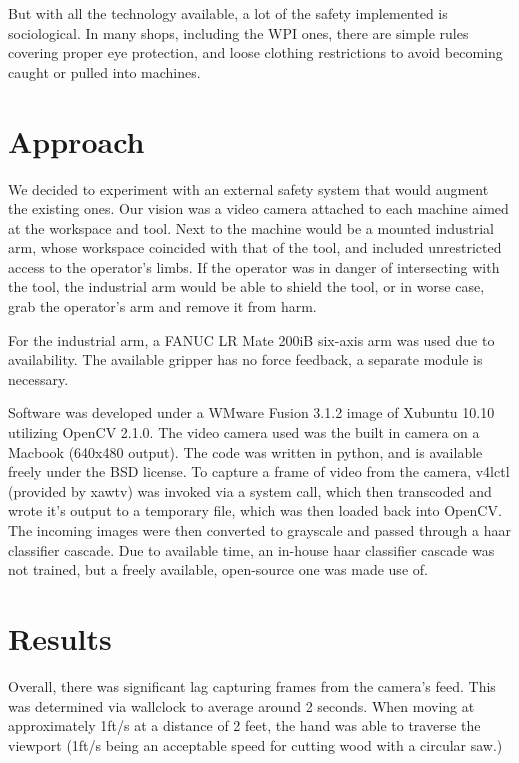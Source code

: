 \documentclass[12pt]{article}
\begin{document}
But with all the technology available, a lot of the safety implemented is sociological. In many shops, including the WPI ones, there are simple rules covering proper eye protection, and loose clothing restrictions to avoid becoming caught or pulled into machines\cite{WPI:safety}.

\section{Approach}
We decided to experiment with an external safety system that would augment the existing ones. Our vision was a video camera attached to each machine aimed at the workspace and tool. Next to the machine would be a mounted industrial arm, whose workspace coincided with that of the tool, and included unrestricted access to the operator's limbs. If the operator was in danger of intersecting with the tool, the industrial arm would be able to shield the tool, or in worse case, grab the operator's arm and remove it from harm.


For the industrial arm, a FANUC LR Mate 200iB six-axis arm was used due to availability\cite{fanuc}. The available gripper has no force feedback, a separate module is necessary. 

Software was developed under a WMware Fusion 3.1.2 image of Xubuntu 10.10 utilizing OpenCV 2.1.0. The video camera used was the built in camera on a Macbook (640x480 output). The code was written in python, and is available freely under the BSD license\cite{google-code}. To capture a frame of video from the camera, v4lctl (provided by xawtv) was invoked via a system call, which then transcoded and wrote it's output to a temporary file, which was then loaded back into OpenCV. The incoming images were then converted to grayscale and passed through a haar classifier cascade. Due to available time, an in-house haar classifier cascade was not trained, but a freely available, open-source one was made use of\cite{haar-hands}.

\section{Results}
Overall, there was significant lag capturing frames from the camera's feed. This was determined via wallclock to average around 2 seconds. When moving at approximately 1ft/s at a distance of 2 feet, the hand was able to traverse the viewport (1ft/s being an acceptable speed for cutting wood with a circular saw\cite{sawstop}.)
\end{document}
